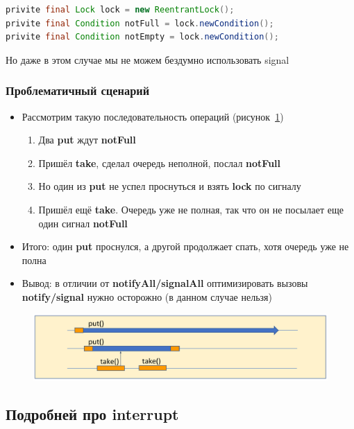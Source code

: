 \documentclass[10pt,a4paper,oneside,titlepage]{article}
\theoremstyle{plain}
\theoremstyle{defenition}
\begin{document}
\begin{lstlisting}[language=Java]
privite final Lock lock = new ReentrantLock();
privite final Condition notFull = lock.newCondition();
privite final Condition notEmpty = lock.newCondition();
\end{lstlisting}

Но даже в этом случае мы не можем бездумно использовать signal

\subsubsection{Проблематичный сценарий}

\begin{itemize}
	\item Рассмотрим такую последовательность операций (рисунок~\ref{fig:queuewait5})
	\begin{enumerate}
		\item Два {\bfseries put} ждут {\bfseries notFull}
		\item Пришёл {\bfseries take}, сделал очередь неполной, послал {\bfseries notFull}
		\item Но один из {\bfseries put} не успел проснуться и взять {\bfseries lock} по сигналу
		\item Пришёл ещё {\bfseries take}. Очередь уже не полная, так что он не посылает еще один сигнал {\bfseries notFull}
	\end{enumerate}
    \item Итого: один {\bfseries put} проснулся, а другой продолжает спать, хотя очередь уже не полна
    \item Вывод: в отличии от {\bfseries notifyAll/signalAll} оптимизировать вызовы {\bfseries notify/signal} нужно осторожно (в данном случае нельзя)
\end{itemize}

\begin{figure}[h!]
	\centering
	\includegraphics[width=0.4\linewidth]{pictures/QueueWait5}
	\caption{}
	\label{fig:queuewait5}
\end{figure}

\subsection{Подробней про interrupt}
\end{document}
